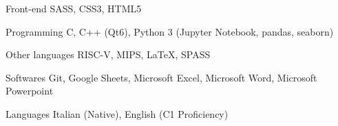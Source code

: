 

\begin{cvskills}

  \cvskill
    {Front-end} %
    {SASS, CSS3, HTML5} %

  \cvskill
    {Programming} %
    {C, C++ (Qt6), Python 3 (Jupyter Notebook, pandas, seaborn)} %

  \cvskill
    {Other languages} %
    {RISC-V, MIPS, LaTeX, SPASS} %

  \cvskill
    {Softwares} %
    {Git, Google Sheets, Microsoft Excel, Microsoft Word, Microsoft Powerpoint} %

  \cvskill
    {Languages} %
    {Italian (Native), English (C1 Proficiency)} %

\end{cvskills}
